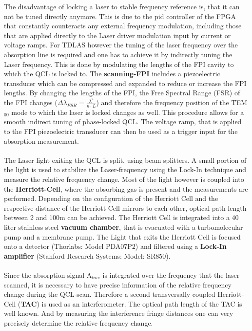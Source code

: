The disadvantage of locking a laser to stable frequency reference is, that it can not be tuned directly anymore. This is due to the pid controller of the FPGA that constantly counteracts any external frequency modulation, including those that are applied directly to the Laser driver modulation input by current or voltage ramps. For TDLAS however the tuning of the laser frequency over the absorption line is required and one has to achieve it by indirectly tuning the Laser frequency. This is done by modulating the lengths of the FPI cavity to which the QCL is locked to. The \textbf{scanning-FPI} includes a piezoelectric transducer which can be compressed and expanded to reduce or increase the FPI lengths. By changing the lengths of the FPI, the Free Spectral Range (FSR) of the FPI changes ($\Delta\lambda_{FSR}=\frac{\lambda^2}{n\cdot L}$) and therefore the frequency position of the TEM$_{00}$ mode to which the laser is locked changes as well.  This procedure allows for a smooth indirect tuning of phase-locked QCL. The voltage ramp, that is applied to the FPI piezoelectric transducer can then be used as a trigger input for the absorption measurement.\\\\
\noindent
The Laser light exiting the QCL is split, using beam splitters. A small portion of the light is used to stabilize the Laser-frequency using the Lock-In technique and measure the relative frequency change. Most of the light however is coupled into the \textbf{Herriott-Cell}, where the absorbing gas is present and the measurements are performed. Depending on the configuration of the Herriott Cell and the respective distance of the Herriott-Cell mirrors to each other, optical path length between 2 and 100m can be achieved. The Herriott Cell is integrated into a 40 liter stainless steel \textbf{vacuum chamber}, that is evacuated with a turbomolecular pump and a membrane pump. The Light that exits the Herriott Cell is focused onto a detector (Thorlabs: Model PDA07P2) and filtered using a \textbf{Lock-In amplifier} (Stanford Research Systems: Model: SR850). \\\\
\noindent
Since the absorption signal A$_{line}$ is integrated over the frequency that the laser scanned, it is necessary to have precise information of the relative frequency change during the QCL-scan. Therefore a second transversally coupled Herriott-Cell (\textbf{TAC}) is used as an interferometer. The optical path length of the TAC is well known. And by measuring the interference fringe distances one can very precisely determine the relative frequency change. \\\\
